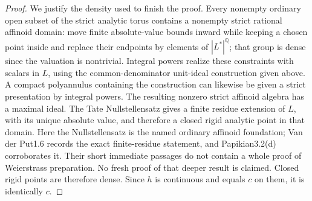 \documentclass[11pt]{article}
\begin{document}
\begin{proof}
We justify the density used to finish the proof. Every nonempty
ordinary open subset of the strict analytic torus contains a
nonempty strict rational affinoid domain: move finite absolute-value
bounds inward while keeping a chosen point inside and replace their
endpoints by elements of $|L^*|^{\mathbb Q}$; that group is dense
since the valuation is nontrivial. Integral powers realize these
constraints with scalars in $L$, using the common-denominator
unit-ideal construction given above. A compact polyannulus containing
the construction can likewise be given a strict presentation by
integral powers. The resulting nonzero strict affinoid algebra has
a maximal ideal. The Tate Nullstellensatz gives a finite residue
extension of $L$, with its unique absolute value, and therefore a
closed rigid analytic point in that domain. Here the Nullstellensatz
is the named ordinary affinoid foundation; Van der Put1.6 records
the exact finite-residue statement, and Papikian3.2(d) corroborates it.
Their short immediate passages do not contain a whole proof of
Weierstrass preparation. No fresh proof of that deeper result is claimed.
Closed rigid points are therefore dense. Since $h$ is continuous and
equals $c$ on them, it is identically $c$.
\end{proof}
\end{document}

